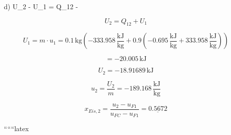 d) \quad U_2 - U_1 = Q_{12} -  \quad {}

\[
U_2 = Q_{12} + U_1
\]

\[
U_1 = m \cdot u_1 = 0.1 \, \text{kg} \left( -333.958 \, \frac{\text{kJ}}{\text{kg}} + 0.9 \left( -0.695 \, \frac{\text{kJ}}{\text{kg}} + 333.958 \, \frac{\text{kJ}}{\text{kg}} \right) \right)
\]

\[
= -20.005 \, \text{kJ}
\]

\[
U_2 = -18.91689 \, \text{kJ}
\]

\[
u_2 = \frac{U_2}{m} = -189.168 \, \frac{\text{kJ}}{\text{kg}}
\]

\[
x_{Eis,2} = \frac{u_2 - u_{F1}}{u_{FC} - u_{F1}} = \underline{0.5672}
\]

``````latex